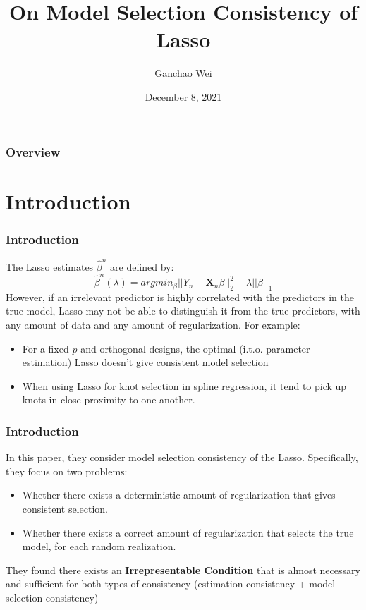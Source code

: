 \documentclass{beamer}
\title[MSC-LASSO]{On Model Selection Consistency of Lasso}
\author{Ganchao Wei}
\date{December 8, 2021}
\begin{document}
	
	\begin{frame}
		\titlepage %
	\end{frame}
	
	\begin{frame}
		\frametitle{Overview} %
		\tableofcontents
	\end{frame}
	
	
	\section{Introduction}
	
	\begin{frame}
		\frametitle{Introduction}
		The Lasso estimates $\hat{\beta}^n$ are defined by:
		$$\hat{\beta}^n(\lambda) = argmin_{\beta}||Y_n - \bm{X}_n\beta||_2^2 + \lambda||\beta||_1$$
		However, if an irrelevant predictor is highly correlated with the predictors in the true model, Lasso may not be able to distinguish it from the true predictors, with any amount of data and any amount of regularization. For example:
		\begin{itemize}
			\item 
			For a fixed $p$ and orthogonal designs, the optimal (i.t.o. parameter estimation) Lasso doesn't give consistent model selection
			\item
			When using Lasso for knot selection in spline regression, it tend to pick up knots in close proximity to one another.
		\end{itemize}
	\end{frame}
	
	
	\begin{frame}
		\frametitle{Introduction}
		In this paper, they consider model selection consistency of the Lasso. Specifically, they focus on two problems:
		\begin{itemize}
			\item 
			Whether there exists a deterministic amount of regularization that gives consistent selection.
			\item
			Whether there exists a correct amount of regularization that selects the true model, for each random realization.
		\end{itemize}
		\vspace{\baselineskip}
		They found there exists an \textbf{Irrepresentable Condition} that is almost necessary and sufficient for both types of consistency (estimation consistency + model selection consistency)
	\end{frame}
	
\end{document}
